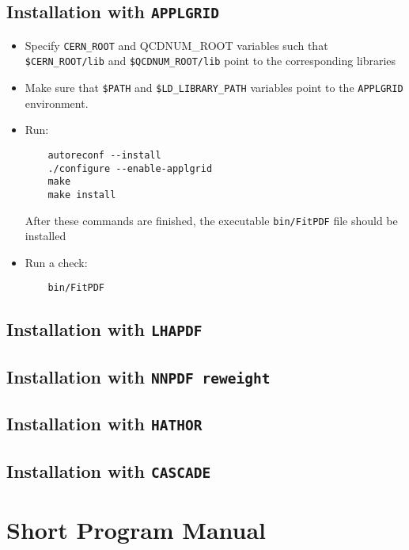 \documentclass[11pt,a4paper]{article}
\begin{document}
\subsection{Installation with {\tt APPLGRID}}
\begin{itemize}
\item
 Specify {\tt CERN\_ROOT} and {QCDNUM\_ROOT} variables such that 
     {\tt \$CERN\_ROOT/lib}  and {\tt \$QCDNUM\_ROOT/lib}
 point to the corresponding libraries
\item Make sure that {\tt \$PATH} and {\tt \$LD\_LIBRARY\_PATH} 
variables point to the {\tt APPLGRID} environment.
\item Run:
\begin{verbatim}
    autoreconf --install
    ./configure --enable-applgrid
    make 
    make install
\end{verbatim}
After these commands are finished, the executable {\tt bin/FitPDF} 
file should be installed
\item  Run a check:
\begin{verbatim}
    bin/FitPDF 
\end{verbatim}
\end{itemize}
\subsection{Installation with {\tt LHAPDF}}
\subsection{Installation with {\tt NNPDF reweight}}
\subsection{Installation with {\tt HATHOR}}
\subsection{Installation with {\tt CASCADE}}

\section{Short Program Manual}
\label{sec:man}
\end{document}
